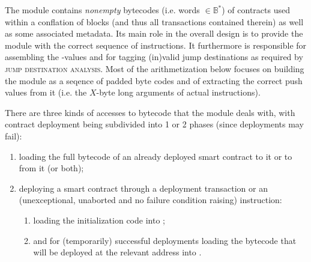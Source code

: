 
The \romMod{} module contains \emph{nonempty} bytecodes (i.e. words $\in\mathbb{B}^*$) of contracts used within a conflation of blocks (and thus all transactions contained therein) as well as some associated metadata.
Its main role in the overall design is to provide the \hubMod{} module with the correct sequence of instructions.
It furthermore is responsible for assembling the -values and for tagging (in)valid jump destinations as required by \textsc{jump destination analysis}.
Most of the arithmetization below focuses on building the \romMod{} module  as a seqence of padded byte codes and of extracting the correct push values from it (i.e. the $X$-byte long arguments of actual  instructions).

There are three kinds of accesses to bytecode that the \romMod{} module  deals with, with contract deployment being subdivided into 1 or 2 phases (since deployments may fail):
\begin{enumerate}
    \item loading the full bytecode of an already deployed smart contract to  it or to  from it (or both);
    \item deploying a smart contract through a deployment transaction or an (unexceptional, unaborted and no failure condition raising)  instruction:
        \begin{enumerate}
            \item loading the initialization code into \romMod{};
            \item and for (temporarily) successful deployments loading the bytecode that will be deployed at the relevant address into \romMod{}.
        \end{enumerate}
\end{enumerate}
